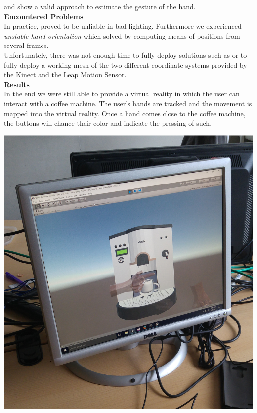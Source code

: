 \documentclass[a0,portrait]{a0poster}
\begin{document}
\begin{multicols}{2}
\cite{kinecthandonline} and \cite{joseph2016fits} show a valid approach to estimate the gesture of the hand.\\[0.1cm]
%
\Huge{\textbf{Encountered Problems} }\\[0.1cm]
In practice, \cite{kinecthandonline} proved to be unliable in bad lighting. Furthermore we experienced \emph{unstable hand orientation} which solved by computing means of positions from several frames. \\
Unfortunately, there was not enough time to fully deploy solutions such as \cite{joseph2016fits} or to fully deploy a working mesh of the two different coordinate systems provided by the Kinect and the Leap Motion Sensor.
\\[0.1cm]
%
\Huge{\textbf{Results} }\\[0.25cm]

%
In the end we were still able to provide a virtual reality in which the user can interact with a coffee machine. The user's hands are tracked and the movement is mapped into the virtual reality. Once a hand comes close to the coffee machine, the buttons will chance their color and indicate the pressing of such.
%
\begin{center}\vspace{1cm}
\includegraphics[width=0.5\linewidth]{./figures/vr_scene.jpg}
\end{center}\vspace{1cm}

\nocite{*} %


\end{multicols}
\end{document}
